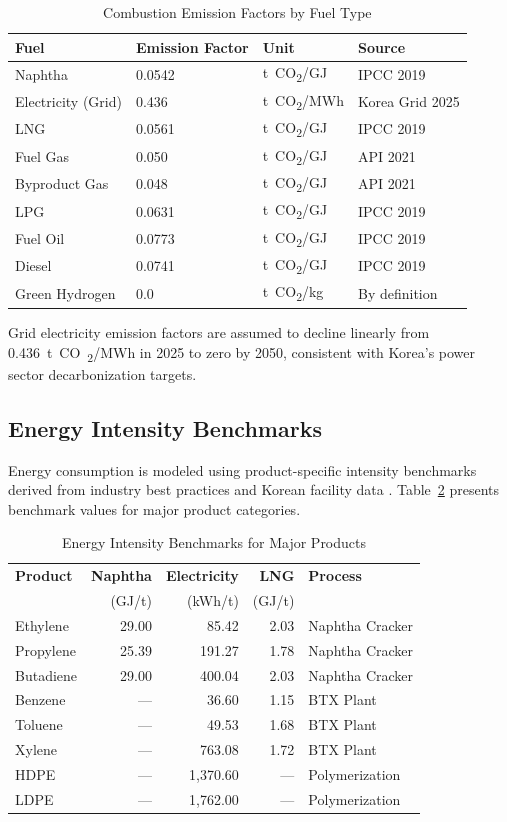 \documentclass[12pt,a4paper]{article}
\newcommand{\COtwo}{CO\textsubscript{2}}
\newcommand{\tco}{t~\COtwo}
\begin{document}
\begin{table}[H]
\centering
\caption{Combustion Emission Factors by Fuel Type}
\label{tab:emission_factors}
\begin{tabular}{@{}llll@{}}
\toprule
\textbf{Fuel} & \textbf{Emission Factor} & \textbf{Unit} & \textbf{Source} \\
\midrule
Naphtha & 0.0542 & \tco/GJ & IPCC 2019 \\
Electricity (Grid) & 0.436 & \tco/MWh & Korea Grid 2025 \\
LNG & 0.0561 & \tco/GJ & IPCC 2019 \\
Fuel Gas & 0.050 & \tco/GJ & API 2021 \\
Byproduct Gas & 0.048 & \tco/GJ & API 2021 \\
LPG & 0.0631 & \tco/GJ & IPCC 2019 \\
Fuel Oil & 0.0773 & \tco/GJ & IPCC 2019 \\
Diesel & 0.0741 & \tco/GJ & IPCC 2019 \\
Green Hydrogen & 0.0 & \tco/kg & By definition \\
\bottomrule
\end{tabular}
\end{table}

Grid electricity emission factors are assumed to decline linearly from \SI{0.436}{t~\COtwo/MWh} in 2025 to zero by 2050, consistent with Korea's power sector decarbonization targets.

\subsection{Energy Intensity Benchmarks}

Energy consumption is modeled using product-specific intensity benchmarks derived from industry best practices and Korean facility data \citep{saygin2011, kier2022}. Table~\ref{tab:energy_intensity} presents benchmark values for major product categories.

\begin{table}[H]
\centering
\caption{Energy Intensity Benchmarks for Major Products}
\label{tab:energy_intensity}
\begin{tabular}{@{}lrrrl@{}}
\toprule
\textbf{Product} & \textbf{Naphtha} & \textbf{Electricity} & \textbf{LNG} & \textbf{Process} \\
 & (GJ/t) & (kWh/t) & (GJ/t) & \\
\midrule
Ethylene & 29.00 & 85.42 & 2.03 & Naphtha Cracker \\
Propylene & 25.39 & 191.27 & 1.78 & Naphtha Cracker \\
Butadiene & 29.00 & 400.04 & 2.03 & Naphtha Cracker \\
Benzene & --- & 36.60 & 1.15 & BTX Plant \\
Toluene & --- & 49.53 & 1.68 & BTX Plant \\
Xylene & --- & 763.08 & 1.72 & BTX Plant \\
HDPE & --- & 1,370.60 & --- & Polymerization \\
LDPE & --- & 1,762.00 & --- & Polymerization \\
\bottomrule
\end{tabular}
\end{table}
\end{document}
